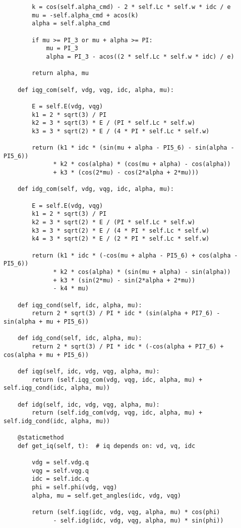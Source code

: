 \begin{lstlisting}
        k = cos(self.alpha_cmd) - 2 * self.Lc * self.w * idc / e
        mu = -self.alpha_cmd + acos(k)
        alpha = self.alpha_cmd

        if mu >= PI_3 or mu + alpha >= PI:
            mu = PI_3
            alpha = PI_3 - acos((2 * self.Lc * self.w * idc) / e)

        return alpha, mu

    def iqg_com(self, vdg, vqg, idc, alpha, mu):

        E = self.E(vdg, vqg)
        k1 = 2 * sqrt(3) / PI
        k2 = 3 * sqrt(3) * E / (PI * self.Lc * self.w)
        k3 = 3 * sqrt(2) * E / (4 * PI * self.Lc * self.w)

        return (k1 * idc * (sin(mu + alpha - PI5_6) - sin(alpha - PI5_6))
              * k2 * cos(alpha) * (cos(mu + alpha) - cos(alpha))
              + k3 * (cos(2*mu) - cos(2*alpha + 2*mu)))

    def idg_com(self, vdg, vqg, idc, alpha, mu):

        E = self.E(vdg, vqg)
        k1 = 2 * sqrt(3) / PI
        k2 = 3 * sqrt(2) * E / (PI * self.Lc * self.w)
        k3 = 3 * sqrt(2) * E / (4 * PI * self.Lc * self.w)
        k4 = 3 * sqrt(2) * E / (2 * PI * self.Lc * self.w)

        return (k1 * idc * (-cos(mu + alpha - PI5_6) + cos(alpha - PI5_6))
              * k2 * cos(alpha) * (sin(mu + alpha) - sin(alpha))
              + k3 * (sin(2*mu) - sin(2*alpha + 2*mu))
              - k4 * mu)

    def iqg_cond(self, idc, alpha, mu):
        return 2 * sqrt(3) / PI * idc * (sin(alpha + PI7_6) - sin(alpha + mu + PI5_6))

    def idg_cond(self, idc, alpha, mu):
        return 2 * sqrt(3) / PI * idc * (-cos(alpha + PI7_6) + cos(alpha + mu + PI5_6))

    def iqg(self, idc, vdg, vqg, alpha, mu):
        return (self.iqg_com(vdg, vqg, idc, alpha, mu) + self.iqg_cond(idc, alpha, mu))

    def idg(self, idc, vdg, vqg, alpha, mu):
        return (self.idg_com(vdg, vqg, idc, alpha, mu) + self.idg_cond(idc, alpha, mu))

    @staticmethod
    def get_iq(self, t):  # iq depends on: vd, vq, idc

        vdg = self.vdg.q
        vqg = self.vqg.q
        idc = self.idc.q
        phi = self.phi(vdg, vqg)
        alpha, mu = self.get_angles(idc, vdg, vqg)

        return (self.iqg(idc, vdg, vqg, alpha, mu) * cos(phi)
              - self.idg(idc, vdg, vqg, alpha, mu) * sin(phi))


\end{lstlisting}
